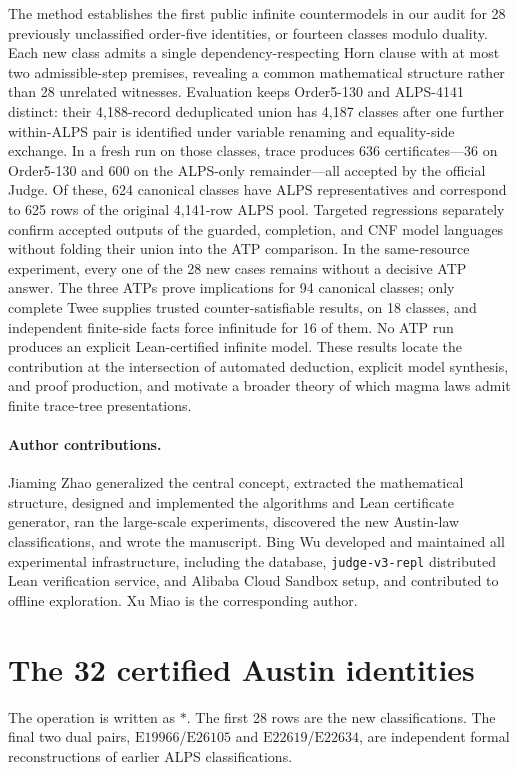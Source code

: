 \documentclass[runningheads]{llncs}
\newcommand{\Law}[1]{\ensuremath{\mathrm{E}#1}}
\begin{document}
The method establishes the first public infinite countermodels in our audit
for 28 previously unclassified order-five identities, or fourteen classes
modulo duality.  Each new class admits a single dependency-respecting Horn
clause with at most two admissible-step premises, revealing a common
mathematical structure rather than 28 unrelated witnesses.  Evaluation keeps
Order5-130 and ALPS-4141 distinct: their 4,188-record deduplicated union has
4,187 classes after one further within-ALPS pair is identified under variable
renaming and equality-side exchange.  In a fresh
run on those classes, trace produces 636 certificates---36 on Order5-130 and
600 on the ALPS-only remainder---all accepted by the official Judge.  Of these,
624 canonical classes have ALPS representatives and correspond to 625 rows of
the original 4,141-row ALPS pool.  Targeted regressions separately confirm accepted outputs of the guarded,
completion, and CNF model languages without folding their union into the ATP
comparison.  In the same-resource experiment, every one of the 28 new cases
remains without a decisive ATP answer.  The three ATPs prove implications for
94 canonical classes; only complete Twee supplies trusted counter-satisfiable
results, on 18 classes, and independent finite-side facts force infinitude for
16 of them.  No ATP run produces an explicit Lean-certified infinite model.
These results
locate the contribution at the intersection of automated deduction, explicit
model synthesis, and proof production, and motivate a broader theory of which
magma laws admit finite trace-tree presentations.

\paragraph{Author contributions.}
Jiaming Zhao generalized the central concept, extracted the mathematical
structure, designed and implemented the algorithms and Lean certificate
generator, ran the large-scale experiments, discovered the new Austin-law
classifications, and wrote the manuscript.  Bing Wu developed and maintained
all experimental infrastructure, including the database,
\texttt{judge-v3-repl} distributed Lean verification service, and Alibaba
Cloud Sandbox setup, and contributed to offline exploration.  Xu Miao is the
corresponding author.

\appendix

\section{The 32 certified Austin identities}
\label{app:identities}

The operation is written as $\ast$.  The first 28 rows are the new
classifications.  The final two dual pairs,
\Law{19966}/\Law{26105} and \Law{22619}/\Law{22634}, are independent formal
reconstructions of earlier ALPS classifications.





\end{document}
